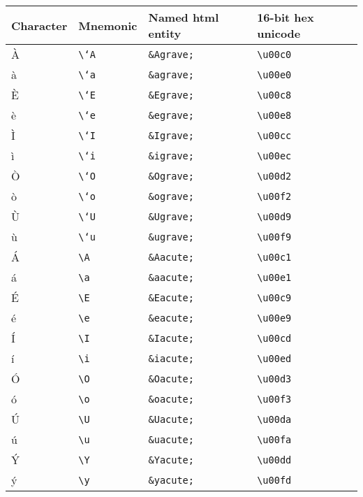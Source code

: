\begin{longtable}[]{@{}llll@{}}
\toprule
Character & Mnemonic & Named html entity & 16-bit hex
unicode\tabularnewline
\midrule
\endhead
À & \texttt{\textbackslash{}`A} & \texttt{\&Agrave;} &
\texttt{\textbackslash{}u00c0}\tabularnewline
à & \texttt{\textbackslash{}`a} & \texttt{\&agrave;} &
\texttt{\textbackslash{}u00e0}\tabularnewline
È & \texttt{\textbackslash{}`E} & \texttt{\&Egrave;} &
\texttt{\textbackslash{}u00c8}\tabularnewline
è & \texttt{\textbackslash{}`e} & \texttt{\&egrave;} &
\texttt{\textbackslash{}u00e8}\tabularnewline
Ì & \texttt{\textbackslash{}`I} & \texttt{\&Igrave;} &
\texttt{\textbackslash{}u00cc}\tabularnewline
ì & \texttt{\textbackslash{}`i} & \texttt{\&igrave;} &
\texttt{\textbackslash{}u00ec}\tabularnewline
Ò & \texttt{\textbackslash{}`O} & \texttt{\&Ograve;} &
\texttt{\textbackslash{}u00d2}\tabularnewline
ò & \texttt{\textbackslash{}`o} & \texttt{\&ograve;} &
\texttt{\textbackslash{}u00f2}\tabularnewline
Ù & \texttt{\textbackslash{}`U} & \texttt{\&Ugrave;} &
\texttt{\textbackslash{}u00d9}\tabularnewline
ù & \texttt{\textbackslash{}`u} & \texttt{\&ugrave;} &
\texttt{\textbackslash{}u00f9}\tabularnewline
Á & \texttt{\textbackslash{}\textquotesingle{}A} & \texttt{\&Aacute;} &
\texttt{\textbackslash{}u00c1}\tabularnewline
á & \texttt{\textbackslash{}\textquotesingle{}a} & \texttt{\&aacute;} &
\texttt{\textbackslash{}u00e1}\tabularnewline
É & \texttt{\textbackslash{}\textquotesingle{}E} & \texttt{\&Eacute;} &
\texttt{\textbackslash{}u00c9}\tabularnewline
é & \texttt{\textbackslash{}\textquotesingle{}e} & \texttt{\&eacute;} &
\texttt{\textbackslash{}u00e9}\tabularnewline
Í & \texttt{\textbackslash{}\textquotesingle{}I} & \texttt{\&Iacute;} &
\texttt{\textbackslash{}u00cd}\tabularnewline
í & \texttt{\textbackslash{}\textquotesingle{}i} & \texttt{\&iacute;} &
\texttt{\textbackslash{}u00ed}\tabularnewline
Ó & \texttt{\textbackslash{}\textquotesingle{}O} & \texttt{\&Oacute;} &
\texttt{\textbackslash{}u00d3}\tabularnewline
ó & \texttt{\textbackslash{}\textquotesingle{}o} & \texttt{\&oacute;} &
\texttt{\textbackslash{}u00f3}\tabularnewline
Ú & \texttt{\textbackslash{}\textquotesingle{}U} & \texttt{\&Uacute;} &
\texttt{\textbackslash{}u00da}\tabularnewline
ú & \texttt{\textbackslash{}\textquotesingle{}u} & \texttt{\&uacute;} &
\texttt{\textbackslash{}u00fa}\tabularnewline
Ý & \texttt{\textbackslash{}\textquotesingle{}Y} & \texttt{\&Yacute;} &
\texttt{\textbackslash{}u00dd}\tabularnewline
ý & \texttt{\textbackslash{}\textquotesingle{}y} & \texttt{\&yacute;} &
\texttt{\textbackslash{}u00fd}\tabularnewline

\end{longtable}

